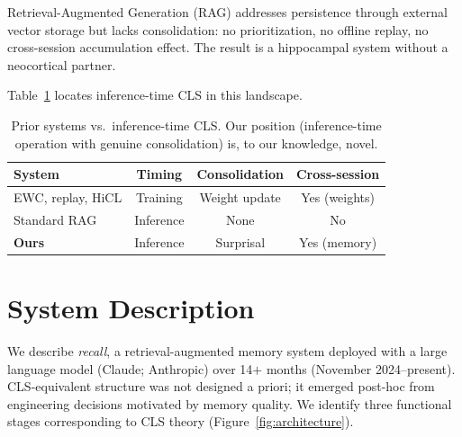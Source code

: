 \documentclass[11pt]{article}
\begin{document}
Retrieval-Augmented Generation (RAG) \citep{lewis2020} addresses
persistence through external vector storage but lacks consolidation:
no prioritization, no offline replay, no cross-session accumulation
effect. The result is a hippocampal system without a neocortical
partner.

Table~\ref{tab:landscape} locates inference-time CLS in this
landscape.

\begin{table}[h]
\centering
\small
\begin{tabular}{lccc}
\toprule
\textbf{System} & \textbf{Timing} & \textbf{Consolidation} &
  \textbf{Cross-session} \\
\midrule
EWC, replay, HiCL & Training & Weight update & Yes (weights) \\
Standard RAG      & Inference & None          & No \\
\textbf{Ours}     & Inference & Surprisal     & Yes (memory) \\
\bottomrule
\end{tabular}
\caption{Prior systems vs.\ inference-time CLS. Our position
(inference-time operation with genuine consolidation) is, to our
knowledge, novel.}
\label{tab:landscape}
\end{table}


\section{System Description}

We describe \textit{recall}, a retrieval-augmented memory system
deployed with a large language model (Claude; Anthropic) over 14$+$
months (November 2024--present). CLS-equivalent structure was not
designed a priori; it emerged post-hoc from engineering decisions
motivated by memory quality. We identify three functional stages
corresponding to CLS theory (Figure~\ref{fig:architecture}).
\end{document}
